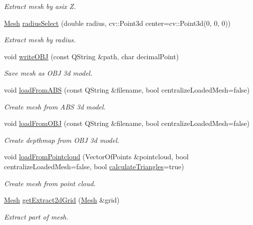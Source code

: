 \begin{DoxyCompactItemize}
\begin{DoxyCompactList}\small\item\em Extract mesh by asix Z. \end{DoxyCompactList}\item 
\hyperlink{class_mesh}{Mesh} \hyperlink{class_mesh_a549432bc9872781b714f3740dd976086}{radius\+Select} (double radius, cv\+::\+Point3d center=cv\+::\+Point3d(0, 0, 0))
\begin{DoxyCompactList}\small\item\em Extract mesh by radius. \end{DoxyCompactList}\item 
void \hyperlink{class_mesh_a822182ddb8a31b9e7c10727a10404ad3}{write\+O\+B\+J} (const Q\+String \&path, char decimal\+Point)
\begin{DoxyCompactList}\small\item\em Save mesh as O\+B\+J 3d model. \end{DoxyCompactList}\item 
void \hyperlink{class_mesh_a017e0441fdff322922dc1090b04d3c37}{load\+From\+A\+B\+S} (const Q\+String \&filename, bool centralize\+Loaded\+Mesh=false)
\begin{DoxyCompactList}\small\item\em Create mesh from A\+B\+S 3d model. \end{DoxyCompactList}\item 
void \hyperlink{class_mesh_a803901209c07edc0b7c3904eccac40bc}{load\+From\+O\+B\+J} (const Q\+String \&filename, bool centralize\+Loaded\+Mesh=false)
\begin{DoxyCompactList}\small\item\em Create depthmap from O\+B\+J 3d model. \end{DoxyCompactList}\item 
void \hyperlink{class_mesh_a87dc88824cf6604b494e774b54a7f0b1}{load\+From\+Pointcloud} (Vector\+Of\+Points \&pointcloud, bool centralize\+Loaded\+Mesh=false, bool \hyperlink{class_mesh_ad69edfbb7cde40edb166831358e0e5ac}{calculate\+Triangles}=true)
\begin{DoxyCompactList}\small\item\em Create mesh from point cloud. \end{DoxyCompactList}\item 
\hyperlink{class_mesh}{Mesh} \hyperlink{class_mesh_a2b8b2a62e220de4cc9e3e19c0a0a6071}{get\+Extract2d\+Grid} (\hyperlink{class_mesh}{Mesh} \&grid)
\begin{DoxyCompactList}\small\item\em Extract part of mesh. \end{DoxyCompactList}\item 

\end{DoxyCompactItemize}
